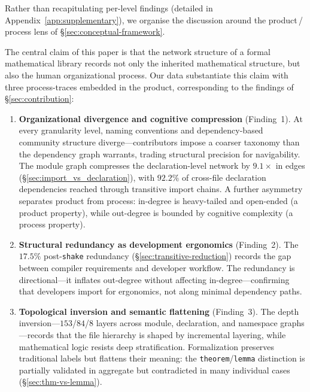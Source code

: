 Rather than recapitulating per-level findings (detailed in Appendix~\ref{app:supplementary}), we organise the discussion around the product\,/\,process lens of \S\ref{sec:conceptual-framework}.

\label{sec:summary}
\label{sec:interplay}
The central claim of this paper is that the network structure of a formal mathematical library records not only the inherited mathematical structure, but also the human organizational process. Our data substantiate this claim with three process-traces embedded in the product, corresponding to the findings of \S\ref{sec:contribution}:

\begin{enumerate}
\item \textbf{Organizational divergence and cognitive compression} (Finding~1). At every granularity level, naming conventions and dependency-based community structure diverge---contributors impose a coarser taxonomy than the dependency graph warrants, trading structural precision for navigability. The module graph compresses the declaration-level network by $9.1\times$ in edges (\S\ref{sec:import_vs_declaration}), with $92.2\%$ of cross-file declaration dependencies reached through transitive import chains. A further asymmetry separates product from process: in-degree is heavy-tailed and open-ended (a product property), while out-degree is bounded by cognitive complexity (a process property).

\item \textbf{Structural redundancy as development ergonomics} (Finding~2). The $17.5\%$ post-\texttt{shake} redundancy (\S\ref{sec:transitive-reduction}) records the gap between compiler requirements and developer workflow. The redundancy is directional---it inflates out-degree without affecting in-degree---confirming that developers import for ergonomics, not along minimal dependency paths.

\item \textbf{Topological inversion and semantic flattening} (Finding~3). The depth inversion---$153$/$84$/$8$ layers across module, declaration, and namespace graphs---records that the file hierarchy is shaped by incremental layering, while mathematical logic resists deep stratification. Formalization preserves traditional labels but flattens their meaning: the \texttt{theorem}/\texttt{lemma} distinction is partially validated in aggregate but contradicted in many individual cases (\S\ref{sec:thm-vs-lemma}).
\end{enumerate}

